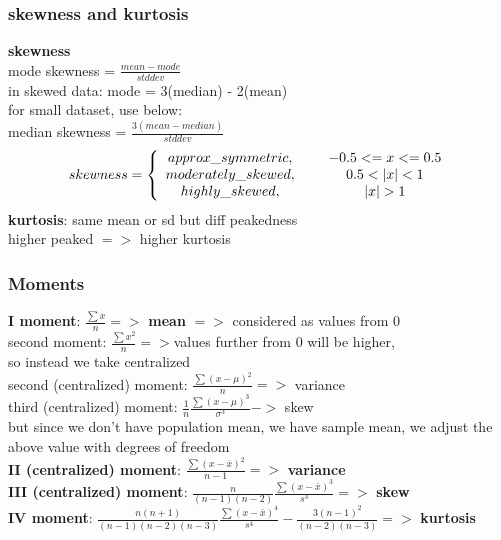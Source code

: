 \documentclass{beamer}
\begin{document}
\begin{frame}\frametitle{skewness and kurtosis}
\textbf{skewness}\\
mode skewness = $\frac{mean-mode}{std dev}$\\
in skewed data: mode = 3(median) - 2(mean) \\
for small dataset, use below:\\
median skewness = $\frac{3(mean-median)}{std dev}$\\
\begin{align}
skewness = \left\{ \begin{array}{cc} 
approx\_symmetric, & \hspace{5mm} -0.5 <= x <=0.5 \\
moderately\_skewed, & \hspace{5mm} 0.5< |x| <1 \\
highly\_skewed, & \hspace{5mm} |x|>1 \\
\end{array} \right.
\end{align}
\textbf{kurtosis}: same mean or sd but diff peakedness\\
higher peaked $=>$ higher kurtosis \\	

\end{frame}

\begin{frame}\frametitle{Moments}
\textbf{I moment}: $\frac{\sum x}{n} =>$ \textbf{mean} $=>$ considered as values from 0\\
second moment: $\frac{\sum x^2}{n} => $values further from 0 will be higher, \\so instead we take centralized \\
second (centralized) moment: $\frac{\sum (x-\mu)^2}{n} =>$ variance\\
third (centralized) moment: $\frac{1}{n} \frac{\sum (x-\mu)^3}{\sigma ^3} ->$ skew\\
but since we don't have population mean, we have sample mean, we adjust the above value with degrees of freedom\\
\textbf{II (centralized) moment}: $\frac{\sum (x-\bar{x})^2}{n-1} =>$ \textbf{variance}\\
\textbf{III (centralized) moment}: $\frac{n}{(n-1)(n-2)} \frac{\sum (x-\bar{x})^3}{s^3} =>$ \textbf{skew}\\
\textbf{IV moment}: $\frac{n(n+1)}{(n-1)(n-2)(n-3)} \frac{\sum (x-\bar{x})^4}{s^4}-\frac{3(n-1)^2}{(n-2)(n-3)} =>$ \textbf{kurtosis}\\

\end{frame}
\end{document}
